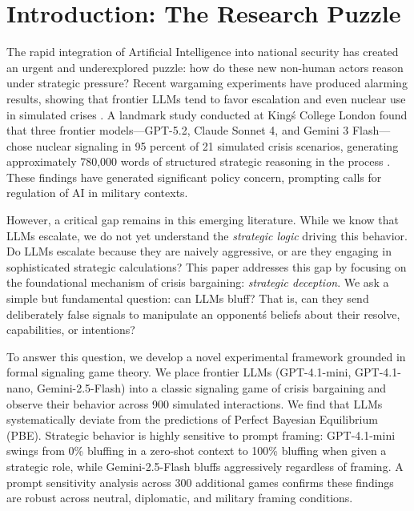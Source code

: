 \documentclass[12pt]{article}
\theoremstyle{plain}
\theoremstyle{definition}
\begin{document}
\newpage

\tableofcontents

\newpage

\section{Introduction: The Research Puzzle}

The rapid integration of Artificial Intelligence into national security has created an urgent and underexplored puzzle: how do these new non-human actors reason under strategic pressure? Recent wargaming experiments have produced alarming results, showing that frontier LLMs tend to favor escalation and even nuclear use in simulated crises \citep{Payne2026, Rivera2024}. A landmark study conducted at King\'s College London found that three frontier models---GPT-5.2, Claude Sonnet 4, and Gemini 3 Flash---chose nuclear signaling in 95 percent of 21 simulated crisis scenarios, generating approximately 780,000 words of structured strategic reasoning in the process \citep{Payne2026}. These findings have generated significant policy concern, prompting calls for regulation of AI in military contexts.

However, a critical gap remains in this emerging literature. While we know that LLMs escalate, we do not yet understand the \textit{strategic logic} driving this behavior. Do LLMs escalate because they are naively aggressive, or are they engaging in sophisticated strategic calculations? This paper addresses this gap by focusing on the foundational mechanism of crisis bargaining: \textit{strategic deception}. We ask a simple but fundamental question: can LLMs bluff? That is, can they send deliberately false signals to manipulate an opponent\'s beliefs about their resolve, capabilities, or intentions?

To answer this question, we develop a novel experimental framework grounded in formal signaling game theory. We place frontier LLMs (GPT-4.1-mini, GPT-4.1-nano, Gemini-2.5-Flash) into a classic signaling game of crisis bargaining and observe their behavior across 900 simulated interactions. We find that LLMs systematically deviate from the predictions of Perfect Bayesian Equilibrium (PBE). Strategic behavior is highly sensitive to prompt framing: GPT-4.1-mini swings from 0\% bluffing in a zero-shot context to 100\% bluffing when given a strategic role, while Gemini-2.5-Flash bluffs aggressively regardless of framing. A prompt sensitivity analysis across 300 additional games confirms these findings are robust across neutral, diplomatic, and military framing conditions.
\end{document}
